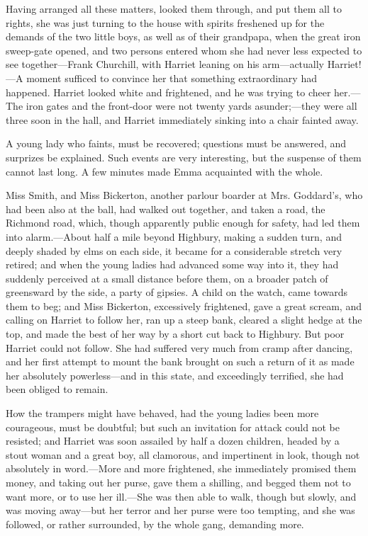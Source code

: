 Having arranged all these matters, looked them through, and put them all to rights, she was just turning to the house with spirits freshened up for the demands of the two little boys, as well as of their grandpapa, when the great iron sweep-gate opened, and two persons entered whom she had never less expected to see together---Frank Churchill, with Harriet leaning on his arm---actually Harriet!---A moment sufficed to convince her that something extraordinary had happened. Harriet looked white and frightened, and he was trying to cheer her.---The iron gates and the front-door were not twenty yards asunder;---they were all three soon in the hall, and Harriet immediately sinking into a chair fainted away.

A young lady who faints, must be recovered; questions must be answered, and surprizes be explained. Such events are very interesting, but the suspense of them cannot last long. A few minutes made Emma acquainted with the whole.

Miss Smith, and Miss Bickerton, another parlour boarder at Mrs. Goddard's, who had been also at the ball, had walked out together, and taken a road, the Richmond road, which, though apparently public enough for safety, had led them into alarm.---About half a mile beyond Highbury, making a sudden turn, and deeply shaded by elms on each side, it became for a considerable stretch very retired; and when the young ladies had advanced some way into it, they had suddenly perceived at a small distance before them, on a broader patch of greensward by the side, a party of gipsies. A child on the watch, came towards them to beg; and Miss Bickerton, excessively frightened, gave a great scream, and calling on Harriet to follow her, ran up a steep bank, cleared a slight hedge at the top, and made the best of her way by a short cut back to Highbury. But poor Harriet could not follow. She had suffered very much from cramp after dancing, and her first attempt to mount the bank brought on such a return of it as made her absolutely powerless---and in this state, and exceedingly terrified, she had been obliged to remain.

How the trampers might have behaved, had the young ladies been more courageous, must be doubtful; but such an invitation for attack could not be resisted; and Harriet was soon assailed by half a dozen children, headed by a stout woman and a great boy, all clamorous, and impertinent in look, though not absolutely in word.---More and more frightened, she immediately promised them money, and taking out her purse, gave them a shilling, and begged them not to want more, or to use her ill.---She was then able to walk, though but slowly, and was moving away---but her terror and her purse were too tempting, and she was followed, or rather surrounded, by the whole gang, demanding more.

